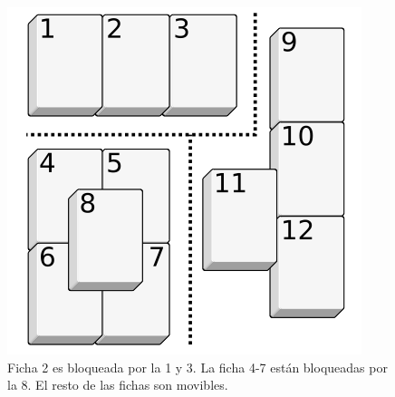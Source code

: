\documentclass{sig-alternate}
\begin{document}
\begin{figure}[h!]
  \begin{center}
  	\includegraphics[scale=0.3]{images/blocking.png}
  \end{center}
  \caption{Ficha 2 es bloqueada por la 1 y 3. La ficha 4-7 est\'an bloqueadas por la 8. El resto de las fichas son movibles.}
  \label{fig:blocking}
\end{figure}
\end{document}
